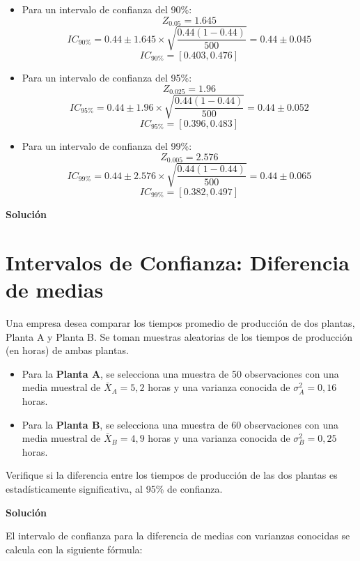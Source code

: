 \documentclass[10pt,a4paper]{article}
\begin{document}
\begin{itemize}
    \item Para un intervalo de confianza del 90\%:
    \[
    Z_{0.05} = 1.645
    \]
    \[
    IC_{90\%} = 0.44 \pm 1.645 \times \sqrt{\frac{0.44(1 - 0.44)}{500}} = 0.44 \pm 0.045
    \]
    \[
    IC_{90\%} = [0.403, 0.476]
    \]

    \item Para un intervalo de confianza del 95\%:
    \[
    Z_{0.025} = 1.96
    \]
    \[
    IC_{95\%} = 0.44 \pm 1.96 \times \sqrt{\frac{0.44(1 - 0.44)}{500}} = 0.44 \pm 0.052
    \]
    \[
    IC_{95\%} = [0.396, 0.483]
    \]

    \item Para un intervalo de confianza del 99\%:
    \[
    Z_{0.005} = 2.576
    \]
    \[
    IC_{99\%} = 0.44 \pm 2.576 \times \sqrt{\frac{0.44(1 - 0.44)}{500}} = 0.44 \pm 0.065
    \]
    \[
    IC_{99\%} = [0.382, 0.497]
    \]
\end{itemize}


\textbf{Solución}


\section{Intervalos de Confianza: Diferencia de medias}

Una empresa desea comparar los tiempos promedio de producción de dos plantas, Planta A y Planta B. Se toman muestras aleatorias de los tiempos de producción (en horas) de ambas plantas.

\begin{itemize}
    \item Para la \textbf{Planta A}, se selecciona una muestra de 50 observaciones con una media muestral de \( \bar{X}_A = 5,2 \) horas y una varianza conocida de \( \sigma_A^2 = 0,16 \) horas.
    \item Para la \textbf{Planta B}, se selecciona una muestra de 60 observaciones con una media muestral de \( \bar{X}_B = 4,9 \) horas y una varianza conocida de \( \sigma_B^2 = 0,25 \) horas.
\end{itemize}

 Verifique si la diferencia entre los tiempos de producción de las dos plantas es estadísticamente significativa, al 95\% de confianza.

\textbf{Solución}

El intervalo de confianza para la diferencia de medias con varianzas conocidas se calcula con la siguiente fórmula:
\end{document}
